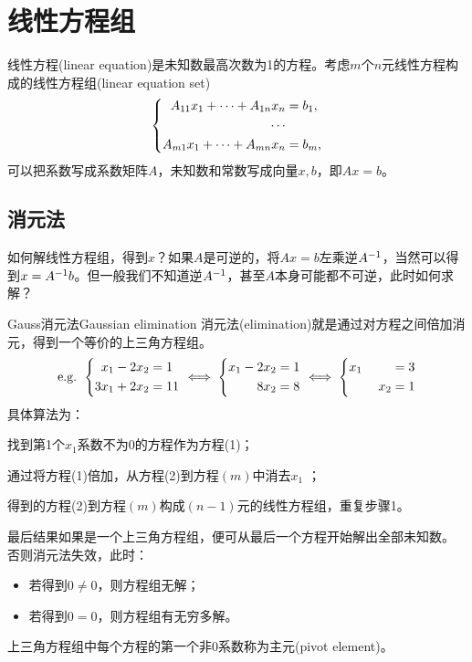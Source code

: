 \chapter{线性方程组}

线性方程(linear equation)是未知数最高次数为1的方程。考虑$m$个$n$元线性方程构成的线性方程组(linear equation set)
\[
	\left\{\begin{aligned}
		A_{11}x_1+\cdots+A_{1n}x_n&=b_1,\\
		\cdots&\\
		A_{m1}x_1+\cdots+A_{mn}x_n&=b_m,
	\end{aligned}\right.
\]
可以把系数写成系数矩阵$A$，未知数和常数写成向量$x,b$，即$Ax=b$。

\section{消元法}
\label{sec:elimination}

如何解线性方程组，得到$x$？如果$A$是可逆的，将$Ax=b$左乘逆$A^{-1}$，当然可以得到$x=A^{-1} b$。但一般我们不知道逆$A^{-1}$，甚至$A$本身可能都不可逆，此时如何求解？

\begin{theorem}{Gauss消元法}{Gaussian elimination}
	消元法(elimination)就是通过对方程之间倍加消元，得到一个等价的上三角方程组。
	\[
		\text{e.g. }\left\{\begin{aligned}
			x_1-2x_2&=1\\3x_1+2x_2&=11
		\end{aligned}\right.\iff
		\left\{\begin{aligned}
			x_1-2x_2&=1\\8x_2&=8
		\end{aligned}\right.\iff
		\left\{\begin{aligned}
			x_1\phantom{-2x_2}&=3\\x_2&=1
		\end{aligned}\right.
	\]
	具体算法为：
	\begin{compactenum}
		\item 找到第1个$x_1$系数不为0的方程作为方程(1)；%
		\item 通过将方程(1)倍加，从方程(2)到方程$(m)$中消去$x_1$ ；
		\item 得到的方程(2)到方程$(m)$构成$(n-1)$元的线性方程组，重复步骤1。
		\item 最后结果如果是一个上三角方程组，便可从最后一个方程开始解出全部未知数。
		否则消元法失效，此时：
		\begin{itemize}
			\item 若得到$0\neq 0$，则方程组无解；
			\item 若得到$0=0$，则方程组有无穷多解。
		\end{itemize}
	\end{compactenum}
	上三角方程组中每个方程的第一个非0系数称为主元(pivot element)。
\end{theorem}

